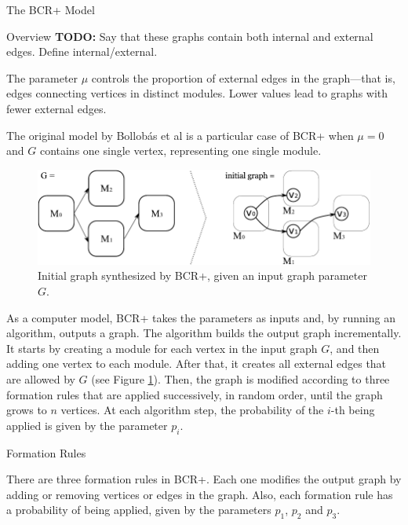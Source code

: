 \documentclass[11pt,twocolumn,a4paper,english]{article}
\newcommand{\TODO}{\textbf{TODO:} }
\begin{document}
\begin{section}{The BCR+ Model}
\begin{subsection}{Overview}
		\TODO Say that these graphs contain both internal and external edges. Define internal/external.
		
	The parameter $\mu$ controls the proportion of external edges in the graph---that is, edges connecting vertices in distinct modules. Lower values lead to graphs with fewer external edges.
	
	The original model by Bollobás et al \cite{Bollobas2003} is a particular case of BCR+ when $\mu = 0$ and $G$ contains one single vertex, representing one single module.
	

\begin{figure}[htbp]
	\centering
		\includegraphics[scale=1]{figures/bcr-initial-graph}
	\caption{Initial graph synthesized by BCR+, given an input graph parameter $G$.}
	\label{fig:bcr-initial-graph}
\end{figure}
	
	As a computer model, BCR+ takes the parameters as inputs and, by running an algorithm, outputs a graph. The algorithm builds the output graph incrementally. It starts by creating a module for each vertex in the input graph $G$, and then adding one vertex to each module. After that, it creates all external edges that are allowed by $G$ (see Figure \ref{fig:bcr-initial-graph}). Then, the graph is modified according to three formation rules that are applied successively, in random order, until the graph grows to $n$ vertices. At each algorithm step, the probability of the $i$-th being applied is given by the parameter $p_i$.

\end{subsection}	

\begin{subsection}{Formation Rules}
	
	There are three formation rules in BCR+. Each one modifies the output graph by adding or removing vertices or edges in the graph. Also, each formation rule has a probability of being applied, given by the parameters $p_1$, $p_2$ and $p_3$.


\end{subsection}
\end{section}
\end{document}
